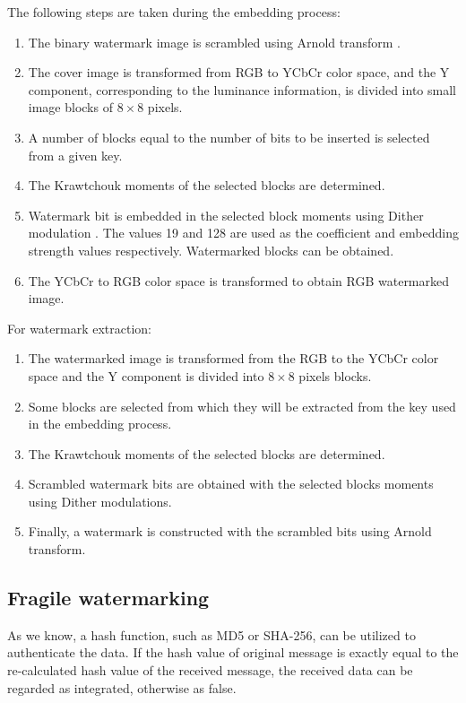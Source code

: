 \documentclass[runningheads]{llncs}
\begin{document}
The following steps are taken during the embedding process:
\begin{enumerate}
	\item The binary watermark image is scrambled using Arnold transform \cite{Arnol'd:1987366}.
	\item The cover image is transformed from RGB to YCbCr color space, and the Y component, corresponding to the luminance information, is divided into small image blocks of $8\times 8$ pixels.
	\item A number of blocks equal to the number of bits to be inserted is selected from a given key.
	\item The Krawtchouk moments \cite{Yap2003} of the selected blocks are determined.
	\item Watermark bit is embedded in the selected block moments using Dither modulation \cite{chen2001quantization}. The values 19 and 128 are used as the coefficient and embedding strength values respectively. Watermarked blocks can be obtained. 
	\item The YCbCr to RGB color space is transformed to obtain RGB watermarked image.
\end{enumerate}

For watermark extraction:
\begin{enumerate}
	\item The watermarked image is transformed from the RGB to the YCbCr color space and the Y component is divided into $8\times 8$ pixels blocks.
	\item Some blocks are selected from which they will be extracted from the key used in the embedding process.
	\item The Krawtchouk moments of the selected blocks are determined.
	\item Scrambled watermark bits are obtained with the selected blocks moments using Dither modulations.
	\item Finally, a watermark is constructed with the scrambled bits using Arnold transform.
\end{enumerate}

\subsection{Fragile watermarking}
As we know, a hash function, such as MD5 or SHA-256, can be utilized to authenticate the data. If the hash value of original message is exactly equal to the re-calculated hash value of the received message, the received data can be regarded as integrated, otherwise as false.
\end{document}
